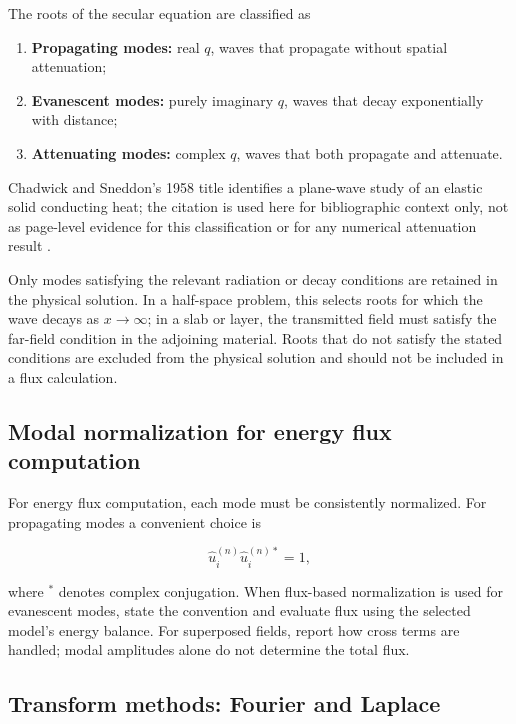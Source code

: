 The roots of the secular equation are classified as

\begin{enumerate}
\item \textbf{Propagating modes:} real $q$, waves that propagate without spatial attenuation;
\item \textbf{Evanescent modes:} purely imaginary $q$, waves that decay exponentially with distance;
\item \textbf{Attenuating modes:} complex $q$, waves that both propagate and attenuate.
\end{enumerate}

Chadwick and Sneddon's 1958 title identifies a plane-wave study of an elastic solid conducting heat; the citation is used here for bibliographic context only, not as page-level evidence for this classification or for any numerical attenuation result \cite{ChadwickSneddon1958}.

Only modes satisfying the relevant radiation or decay conditions are retained in the physical solution. In a half-space problem, this selects roots for which the wave decays as $x \to \infty$; in a slab or layer, the transmitted field must satisfy the far-field condition in the adjoining material. Roots that do not satisfy the stated conditions are excluded from the physical solution and should not be included in a flux calculation.

\subsection{Modal normalization for energy flux computation}
\label{sec:8.5}

For energy flux computation, each mode must be consistently normalized. For propagating modes a convenient choice is

\begin{equation}
\hat{u}_i^{(n)} \hat{u}_i^{(n)*} = 1,
\label{eq:8.5}
\end{equation}

where $^{*}$ denotes complex conjugation. When flux-based normalization is used for evanescent modes, state the convention and evaluate flux using the selected model’s energy balance. For superposed fields, report how cross terms are handled; modal amplitudes alone do not determine the total flux.

\subsection{Transform methods: Fourier and Laplace}
\label{sec:8.6}

